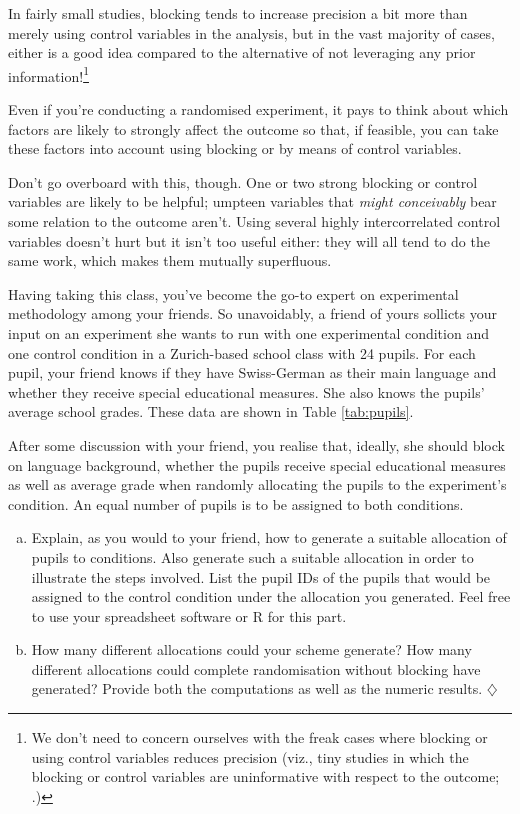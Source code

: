\documentclass[a4paper]{tufte-book}\usepackage[]{graphicx}\usepackage[]{xcolor}
\newcommand*{\parend}[1][$\diamondsuit$]{%
\leavevmode\unskip\penalty9999 \hbox{}\nobreak\hfill
    \quad\hbox{#1}%
}
\begin{document}
In fairly small studies, blocking tends to increase precision a bit more than
merely using control variables in the analysis, but in the vast majority of
cases, either is a good idea compared to the alternative of not leveraging
any prior information!\footnote{We don't need to concern ourselves with the freak
cases where blocking or using control variables reduces precision (viz.,
tiny studies in which the blocking or control variables are
uninformative with respect to the outcome; \citealp{Imai2008}.)}

 \begin{framed}
 Even if you're conducting a randomised experiment, it pays to
 think about which factors are likely to strongly affect the outcome so that, if feasible, you
 can take these factors into account using blocking or by means of control variables.
 \end{framed}

Don't go overboard with this, though. One or two strong blocking or control
variables are likely to be helpful; umpteen variables that \emph{might conceivably}
bear some relation to the outcome aren't.
Using several highly intercorrelated control variables doesn't hurt but it 
isn't too useful either:
they will all tend to do the same work, 
which makes them mutually superfluous.

Having taking this class, you've become the go-to expert
  on experimental methodology among your friends. So unavoidably, a
  friend of yours sollicts your input on an experiment she wants to run with
  one experimental condition and one control condition in a Zurich-based school class
  with 24 pupils.
  For each pupil, your friend knows if they have Swiss-German as their main
  language and whether they receive special educational measures.
  She also knows the pupils' average school grades.
  These data are shown in Table \vref{tab:pupils}.

After some discussion with your friend, you realise that, ideally,
she should block on language background, whether the pupils receive special educational
measures as well as average grade when randomly allocating the pupils to
the experiment's condition. An equal number of pupils is to be assigned
to both conditions.

  \begin{enumerate}[(a)]
    \item Explain, as you would to your friend, how to generate
          a suitable allocation of pupils to conditions.
          Also generate such a suitable allocation in order to illustrate
          the steps involved.
          List the pupil IDs of the pupils that would be assigned to the control
          condition under the allocation you generated.
          Feel free to use your spreadsheet software or R for this part.
    \item How many different allocations could your scheme generate?
          How many different allocations could complete randomisation without
          blocking have generated?
          Provide both the computations as well as the numeric results. \parend
  \end{enumerate}
\end{document}
